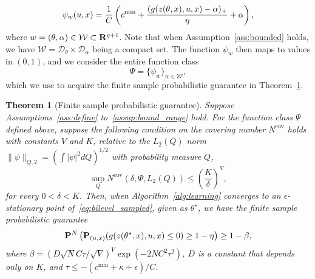 \documentclass[11pt]{article}
\newtheorem{assumption}{Assumption}
\newtheorem{theorem}{Theorem}[section]
\newtheorem{assumption}{Assumption}[section]
\newcommand{\bsnote}[1]{\noindent\textcolor{red}{\texttt{Bartolomeo: #1}}}
\newcommand{\RC}[1]{\textcolor{black}{#1}}
\begin{document}
\begin{equation}
	\label{g_setting}
\psi_{w}(u, x) = \frac{1}{C} \left(c^{\rm min} + \frac{(g(z(\theta,x), u, x) - \alpha)_{+}}{\eta} + \alpha\right),
\end{equation}
where $w = (\theta, \alpha) \in \mathcal{W} \subset {\mathbf R}^{q+1}$.
Note that when Assumption~\ref{ass:bounded} holds, we have $\mathcal{W} = \mathcal{D}_{\theta} \times \mathcal{D}_{\alpha}$ being a compact set.
The function \RC{$\psi_{w}$} then maps to values in $(0,1)$, and we consider the entire function class
\RC{$$\Psi =  \{\psi_{w}\}_{w \in\mathcal{W}},$$}
which we use to acquire the finite sample probabilistic guarantee in Theorem~\ref{thm:fin_sample}.
\begin{theorem}[Finite sample probabilistic guarantee]
	\label{thm:fin_sample}
Suppose Assumptions~\ref{ass:define} to~\ref{assup:bound_range} hold.
For the function class $\Psi$ defined above, suppose the following condition on the covering number $N^{\text{cov}}$ holds with constants $V$ and $K$, relative to the $L_2(Q)$ norm~$\|\psi\|_{Q,2} = (\int |\psi|^2 dQ)^{1/2}$ with probability measure $Q$,
\begin{equation}
    \label{eq:covering}
\sup_Q N^{\text{cov}}(\delta,\Psi,L_2(Q)) \leq \left (\frac{K}{\delta}\right )^V,
\end{equation}
for every $0 < \delta < K$. Then, when Algorithm~\ref{alg:learning} converges to an $\epsilon$-stationary point of~\eqref{eq:bilevel_sampled}, given as $\theta^\star$, we have the finite sample probabilistic guarantee
\begin{equation}
	\label{eq:prob_guarantee_fin}
	{\mathbf P}^{N}\left ({\mathbf P}_{(u,x)}(g(z(\theta^\star,x),u,x)\leq 0) \geq 1 - \eta \right) \geq 1 - \beta,
	\end{equation}
	where \RC{$\beta = (D\sqrt{N}C\tau/\sqrt{V})^V\exp(-2NC^2\tau^2)$}, $D$ is a constant that depends only on $K$, and $\tau \leq -(c^{\min}+\kappa+\epsilon)/C$. 
\end{theorem}
\end{document}
